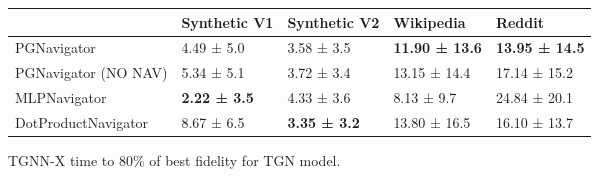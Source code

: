 \begin{tabular}{lllll}
\toprule
 & Synthetic V1 & Synthetic V2 & Wikipedia & Reddit \\
\midrule
PGNavigator & 4.49 ± 5.0 & 3.58 ± 3.5 & \bfseries 11.90 ± 13.6 & \bfseries 13.95 ± 14.5 \\
PGNavigator (NO NAV) & 5.34 ± 5.1 & 3.72 ± 3.4 & 13.15 ± 14.4 & 17.14 ± 15.2 \\
MLPNavigator & \bfseries 2.22 ± 3.5 & 4.33 ± 3.6 & 8.13 ± 9.7 & 24.84 ± 20.1 \\
DotProductNavigator & 8.67 ± 6.5 & \bfseries 3.35 ± 3.2 & 13.80 ± 16.5 & 16.10 ± 13.7 \\
\bottomrule
\end{tabular}
\caption{\label{tab:tgn_time}TGNN-X time to 80\% of best fidelity for TGN model.}

